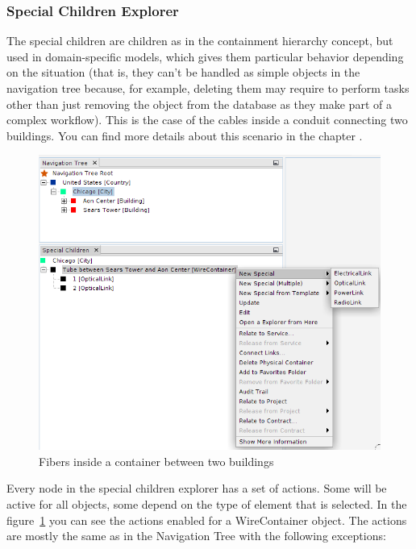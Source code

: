 \documentclass[a4paper]{article}
\begin{document}
		\subsubsection{Special Children Explorer} \label{sec:extra_explorers_children_explorer}							
		The special children are children as in the containment hierarchy concept, but used in domain-specific models, which gives them particular behavior depending on the situation (that is, they can't be handled as simple objects in the navigation tree because, for example, deleting them may require to perform tasks other than just removing the object from the database as they make part of a complex workflow). This is the case of the cables inside a conduit connecting two buildings. You can find more details about this scenario in the chapter \textbf{}.
						
		\begin{figure}[h!]
			\centering
			\includegraphics[width=0.7\linewidth]{img/navigation_tree_special_children_explorer.png}
			\caption{Fibers inside a container between two buildings}
			\label{fig:navigation_tree_special_children_explorer}
		\end{figure}
		
		Every node in the special children explorer has a set of actions. Some will be active for all objects, some depend on the type of element that is selected. In the figure~\ref{fig:navigation_tree_special_children_explorer} you can see the actions enabled for a WireContainer object. The actions are mostly the same as in the Navigation Tree with the following exceptions:
		
\end{document}
